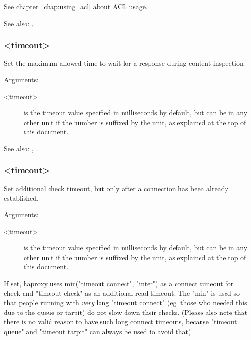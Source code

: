 {  See chapter~\ref{chap:using_acl} about ACL usage.

  See also: , 

\subsubsection[tcp-response]{ <timeout>}


  Set the maximum allowed time to wait for a response during content inspection


  Arguments:
  \begin{description}
  \item[<timeout>] is the timeout value specified in milliseconds by default, but
              can be in any other unit if the number is suffixed by the unit,
              as explained at the top of this document.
  \end{description}

  See also: , .

\subsubsection[timeout check]{ <timeout>}

  Set additional check timeout, but only after a connection has been already
  established.


  Arguments:
  \begin{description}
  \item[<timeout>] is the timeout value specified in milliseconds by default, but
              can be in any other unit if the number is suffixed by the unit,
              as explained at the top of this document.
  \end{description}

  If set, haproxy uses min("timeout connect", "inter") as a connect timeout
  for check and "timeout check" as an additional read timeout. The "min" is
  used so that people running with \emph{very} long "timeout connect" (eg. those
  who needed this due to the queue or tarpit) do not slow down their checks.
  (Please also note that there is no valid reason to have such long connect
  timeouts, because "timeout queue" and "timeout tarpit" can always be used to
  avoid that).

}
